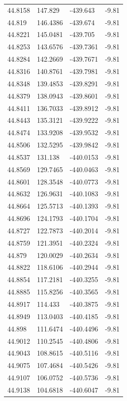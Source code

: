 \begin{table}[H]
\begin{tabular}{llll}
44.8158 & 147.829 & -439.643 & -9.81 \\
44.819 & 146.4386 & -439.674 & -9.81 \\
44.8221 & 145.0481 & -439.705 & -9.81 \\
44.8253 & 143.6576 & -439.7361 & -9.81 \\
44.8284 & 142.2669 & -439.7671 & -9.81 \\
44.8316 & 140.8761 & -439.7981 & -9.81 \\
44.8348 & 139.4853 & -439.8291 & -9.81 \\
44.8379 & 138.0943 & -439.8601 & -9.81 \\
44.8411 & 136.7033 & -439.8912 & -9.81 \\
44.8443 & 135.3121 & -439.9222 & -9.81 \\
44.8474 & 133.9208 & -439.9532 & -9.81 \\
44.8506 & 132.5295 & -439.9842 & -9.81 \\
44.8537 & 131.138 & -440.0153 & -9.81 \\
44.8569 & 129.7465 & -440.0463 & -9.81 \\
44.8601 & 128.3548 & -440.0773 & -9.81 \\
44.8632 & 126.9631 & -440.1083 & -9.81 \\
44.8664 & 125.5713 & -440.1393 & -9.81 \\
44.8696 & 124.1793 & -440.1704 & -9.81 \\
44.8727 & 122.7873 & -440.2014 & -9.81 \\
44.8759 & 121.3951 & -440.2324 & -9.81 \\
44.879 & 120.0029 & -440.2634 & -9.81 \\
44.8822 & 118.6106 & -440.2944 & -9.81 \\
44.8854 & 117.2181 & -440.3255 & -9.81 \\
44.8885 & 115.8256 & -440.3565 & -9.81 \\
44.8917 & 114.433 & -440.3875 & -9.81 \\
44.8949 & 113.0403 & -440.4185 & -9.81 \\
44.898 & 111.6474 & -440.4496 & -9.81 \\
44.9012 & 110.2545 & -440.4806 & -9.81 \\
44.9043 & 108.8615 & -440.5116 & -9.81 \\
44.9075 & 107.4684 & -440.5426 & -9.81 \\
44.9107 & 106.0752 & -440.5736 & -9.81 \\
44.9138 & 104.6818 & -440.6047 & -9.81 \\

\end{tabular}
\end{table}
